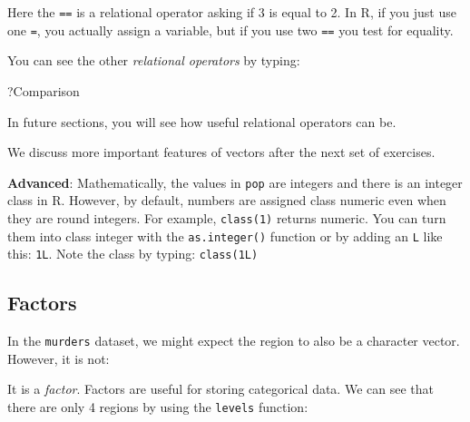 \documentclass[
]{krantz}
\newenvironment{Shaded}{\begin{snugshade}}{\end{snugshade}}
\newcommand{\CommentTok}[1]{\textcolor[rgb]{0.37,0.37,0.37}{\textit{#1}}}
\newcommand{\KeywordTok}[1]{\textcolor[rgb]{0.27,0.27,0.27}{\textbf{#1}}}
\newcommand{\NormalTok}[1]{#1}
\newcommand{\OperatorTok}[1]{\textcolor[rgb]{0.43,0.43,0.43}{\textbf{#1}}}
\begin{document}
Here the \texttt{==} is a relational operator asking if 3 is equal to 2. In R, if you just use one \texttt{=}, you actually assign a variable, but if you use two \texttt{==} you test for equality.

You can see the other \emph{relational operators} by typing:

\begin{Shaded}
\begin{Highlighting}[]
\NormalTok{?Comparison}
\end{Highlighting}
\end{Shaded}

In future sections, you will see how useful relational operators can be.

We discuss more important features of vectors after the next set of exercises.

\textbf{Advanced}: Mathematically, the values in \texttt{pop} are integers and there is an integer class in R. However, by default, numbers are assigned class numeric even when they are round integers. For example, \texttt{class(1)} returns numeric. You can turn them into class integer with the \texttt{as.integer()} function or by adding an \texttt{L} like this: \texttt{1L}. Note the class by typing: \texttt{class(1L)}

\hypertarget{factors}{%
\subsection{Factors}\label{factors}}

In the \texttt{murders} dataset, we might expect the region to also be a character vector. However, it is not:

\begin{Shaded}
\end{Shaded}

It is a \emph{factor}. Factors are useful for storing categorical data. We can see that there are only 4 regions by using the \texttt{levels} function:

\begin{Shaded}
\end{Shaded}
\end{document}
